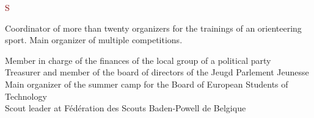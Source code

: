 \documentclass[9pt,a4paper]{article}
\begin{document}
\begin{cv}{}
\begin{cvlist}{\textcolor{Maroon}{S}}			\label{Social life}
		\item[2022 $\rightarrow$ 2025] Coordinator of more than twenty organizers for the trainings of an orienteering sport. Main organizer of multiple competitions.
        \item[And also...] Member in charge of the finances of the local group of a political party\\
        Treasurer and member of the board of directors of the Jeugd Parlement Jeunesse\\
        Main organizer of the summer camp for the Board of European Students of Technology\\
        Scout leader at F\'ed\'eration des Scouts Baden-Powell de Belgique
\end{cvlist}
\end{cv}
\end{document}
